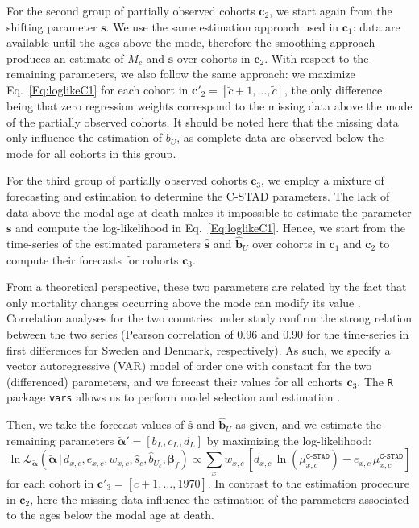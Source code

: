 \documentclass[11pt, a4paper]{article}
\begin{document}
For the second group of partially observed cohorts $\bm{c}_2$, we start again from the shifting parameter $\bm{s}$. We use the same estimation approach used in $\bm{c}_1$: data are available until the ages above the mode, therefore the smoothing approach produces an estimate of $M_c$ and $\hat{\bm{s}}$ over cohorts in $\bm{c}_2$. With respect to the remaining parameters, we also follow the same approach: we maximize Eq.~\eqref{Eq:loglikeC1} for each cohort {\color{red}in $\bm{c}'_2=\left[\breve{c}+1,\ldots,\tilde{c}\right]$}, the only difference being that zero regression weights correspond to the missing data above the mode of the partially observed cohorts. It should be noted here that the missing data only influence the estimation of $b_U$, as complete data are observed below the mode for all cohorts in this group. 

For the third group of partially observed cohorts $\bm{c}_3$, we employ a mixture of forecasting and estimation to determine the C-STAD parameters. The lack of data above the modal age at death makes it impossible to estimate the parameter $\bm{s}$ and compute the log-likelihood in Eq.~\eqref{Eq:loglikeC1}. Hence, we start from the time-series of the estimated parameters $\hat{\bm{s}}$ and $\hat{\bm{b}}_U$ over cohorts in $\bm{c}_1$ and $\bm{c}_2$ to compute their forecasts for cohorts $\bm{c}_3$. 

From a theoretical perspective, these two parameters are related by the fact that only mortality changes occurring above the mode can modify its value \cite[cf.~Appendix B in][]{canudas2010three}. Correlation analyses for the two countries under study confirm the strong relation between the two series (Pearson correlation of 0.96 and 0.90 for the time-series in first differences for Sweden and Denmark, respectively). As such, we specify a vector autoregressive (VAR) model of order one with constant for the two (differenced) parameters, and we forecast their values for all cohorts $\bm{c}_3$. The \texttt{R} package \texttt{vars} allows us to perform model selection and estimation \citep{pfaff2008analysis,pfaff2008var}.

Then, we take the forecast values of $\hat{\bm{s}}$ and $\hat{\bm{b}}_U$ as given, and we estimate the remaining parameters $\breve{\bm{\alpha}}'=\left[b_{L},c_{L},d_{L}\right]$ by maximizing the log-likelihood:
%
\begin{equation}\label{Eq:loglikeC3}
\ln\mathcal{L}_{\breve{\bm{\alpha}}}\left(\breve{\bm{\alpha}}\,|\,d_{x,c} , e_{x,c} , w_{x,c} , \hat{s}_{c}, \hat{b}_{U_{c}} , \bm{\beta}_{f} \right) \propto  \sum_{x} w_{x,c} \, \left[  d_{x,c} \,
\ln \left( \mu^{\texttt{C-STAD}}_{x,c}  \right) - e_{x,c}
\, \mu^{\texttt{C-STAD}}_{x,c} \right] 
\end{equation}
%
for each cohort {\color{red}in $\bm{c}'_3=\left[\tilde{c}+1,\ldots,1970\right]$}. In contrast to the estimation procedure in $\bm{c}_2$, here the missing data influence the estimation of the parameters associated to the ages below the modal age at death. \par
\end{document}
